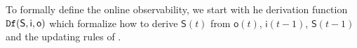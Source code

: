 






To formally define the online observability, we start with he derivation function ${\tt Df}( \mathsf{S},  \mathsf{i},  \mathsf{o})$ which formalize how to derive $\mathsf{S}(t)$ from $\mathsf{o}(t)$, $\mathsf{i}(t-1)$, $\mathsf{S}(t-1)$ and the updating rules of \BCN.  %

